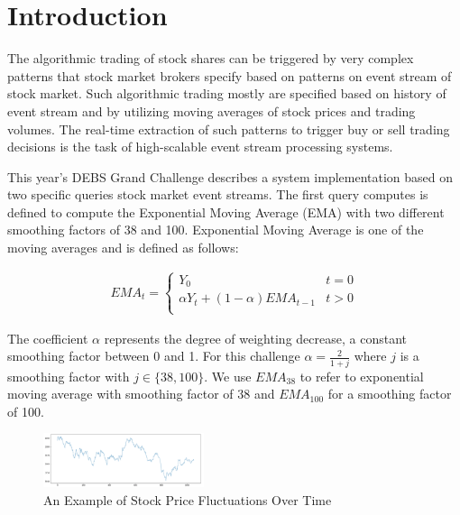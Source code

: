 
\section{Introduction}
The algorithmic trading of stock shares can be triggered by very complex patterns that stock market 
brokers specify based on patterns on event stream of stock market. Such algorithmic trading mostly are specified based on 
history of event stream and by utilizing moving averages of stock prices and trading volumes. The real-time extraction of 
such patterns to trigger buy or sell trading decisions is the task of high-scalable event stream processing systems. 

This year's DEBS Grand Challenge \cite{debs2022challenge} describes a system implementation based on two specific queries 
stock market event streams. The first query computes is defined to compute the Exponential Moving Average (EMA) with two different smoothing factors 
of 38 and 100. Exponential Moving Average is one of the moving averages and is defined as follows:

\begin{align*}
    EMA_t = \begin{cases} 
        Y_0 &  t = 0 \\ 
        \alpha Y_t + (1-\alpha) EMA_{t-1}& t>0 \\ 
        \end{cases}
\end{align*}

The coefficient $\alpha$ represents the degree of weighting decrease, a constant smoothing factor between 0 and 1.
For this challenge $\alpha = \frac{2}{1+j}$ where $j$ is a smoothing factor with $j \in \{38, 100 \}$.
We use $EMA_{38}$ to refer to exponential moving average with smoothing factor of 38 
and $EMA_{100}$ for a smoothing factor of 100. 


\begin{figure}[!ht]
    \begin{center}
        \includegraphics[width=0.42\textwidth]{./images/stock_example.png}
        \caption{An Example of Stock Price Fluctuations Over Time}
        \label{fig:stock}
    \end{center}
\end{figure}




